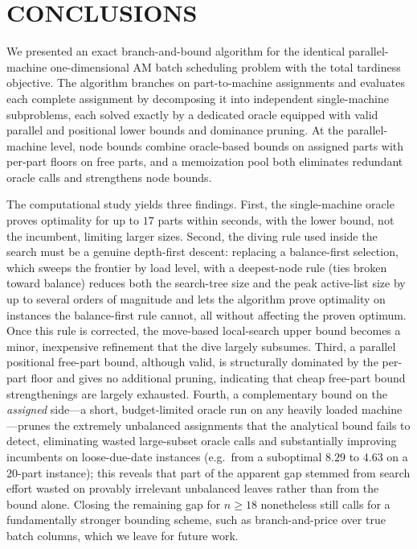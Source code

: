 \documentclass[review,3p,times,authoryear]{elsarticle}
\begin{document}
\section{CONCLUSIONS}


We presented an exact branch-and-bound algorithm for the identical
parallel-machine one-dimensional AM batch scheduling problem with the total
tardiness objective. The algorithm branches on part-to-machine assignments and
evaluates each complete assignment by decomposing it into independent
single-machine subproblems, each solved exactly by a dedicated oracle equipped
with valid parallel and positional lower bounds and dominance pruning. At the
parallel-machine level, node bounds combine oracle-based bounds on assigned
parts with per-part floors on free parts, and a memoization pool both eliminates
redundant oracle calls and strengthens node bounds.

The computational study yields three findings. First, the single-machine oracle
proves optimality for up to $17$ parts within seconds, with the lower bound, not
the incumbent, limiting larger sizes. Second, the diving rule used inside the
search must be a genuine depth-first descent: replacing a balance-first selection,
which sweeps the frontier by load level, with a deepest-node rule (ties broken
toward balance) reduces both the search-tree size and the peak active-list size by
up to several orders of magnitude and lets the algorithm prove optimality on
instances the balance-first rule cannot, all without affecting the proven optimum.
Once this rule is corrected, the move-based local-search upper bound becomes a
minor, inexpensive refinement that the dive largely subsumes. Third, a parallel positional free-part
bound, although valid, is structurally dominated by the per-part floor and gives
no additional pruning, indicating that cheap free-part bound strengthenings are
largely exhausted. Fourth, a complementary bound on the \emph{assigned} side---a
short, budget-limited oracle run on any heavily loaded machine---prunes the
extremely unbalanced assignments that the analytical bound fails to detect,
eliminating wasted large-subset oracle calls and substantially improving
incumbents on loose-due-date instances (e.g.\ from a suboptimal $8.29$ to $4.63$
on a $20$-part instance); this reveals that part of the apparent gap stemmed from
search effort wasted on provably irrelevant unbalanced leaves rather than from the
bound alone. Closing the remaining gap for $n\ge 18$ nonetheless still calls for a
fundamentally stronger bounding scheme, such as branch-and-price over true batch
columns, which we leave for future work.
\end{document}
